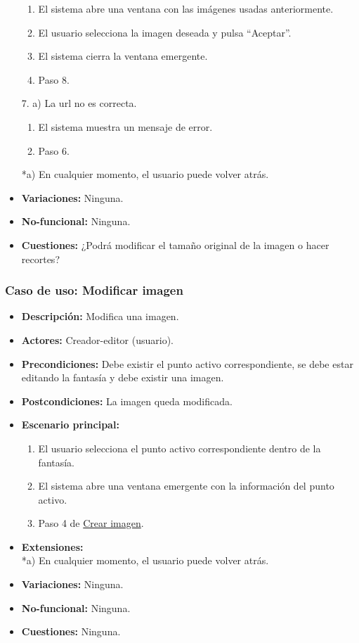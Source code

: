 \begin{itemize}
	\begin{enumerate}
		\item El sistema abre una ventana con las imágenes usadas anteriormente.
		\item El usuario selecciona la imagen deseada y pulsa ``Aceptar''.
		\item El sistema cierra la ventana emergente.
		\item Paso 8.
	\end{enumerate}
	7. a) La url no es correcta.
	\begin{enumerate}
		\item El sistema muestra un mensaje de error.
		\item Paso 6.
	\end{enumerate}
	*a) En cualquier momento, el usuario puede volver atrás.
	\item \textbf{Variaciones:} Ninguna.
	\item \textbf{No-funcional:} Ninguna.
	\item \textbf{Cuestiones:} ¿Podrá modificar el tamaño original de la imagen o hacer recortes?
\end{itemize}

\subsubsection{Caso de uso: Modificar imagen}
\begin{itemize}
	\item \textbf{Descripción:} Modifica una imagen.
	\item \textbf{Actores:} Creador-editor (usuario).
	\item \textbf{Precondiciones:} Debe existir el punto activo correspondiente, se debe estar editando la fantasía y debe existir una imagen.
	\item \textbf{Postcondiciones:} La imagen queda modificada.
	\item \textbf{Escenario principal:}
	\begin{enumerate}
		\item El usuario selecciona el punto activo correspondiente dentro de la fantasía.
		\item El sistema abre una ventana emergente con la información del punto activo.
		\item Paso 4 de \hyperlink{crearimagen}{Crear imagen}.
	\end{enumerate}
	\item \textbf{Extensiones:} \\ *a) En cualquier momento, el usuario puede volver atrás.
	\item \textbf{Variaciones:} Ninguna.
	\item \textbf{No-funcional:} Ninguna.
	\item \textbf{Cuestiones:} Ninguna.
\end{itemize}

